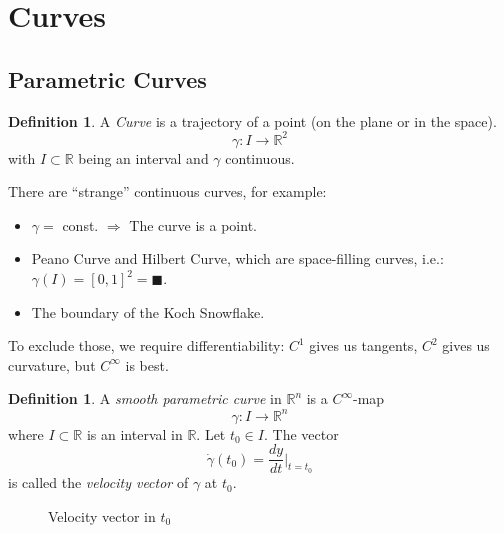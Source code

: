 \documentclass[a4paper,11pt,notitlepage,fullpage]{paper}
\theoremstyle{plain}
\theoremstyle{definition}
\newtheorem{defn}[thm]{Definition} %
\begin{document}
\section{Curves}

\subsection{Parametric Curves}

\begin{defn}
A \emph{Curve} is a trajectory of a point (on the plane or in the space).
\begin{equation*}
\gamma: I \to \mathbb R^2
\end{equation*}
with $I \subset \mathbb R$ being an interval and $\gamma$ continuous.
\end{defn}

There are ``strange'' continuous curves, for example:
\begin{itemize}
\item $\gamma = $ const. $\Rightarrow$ The curve is a point.

\item Peano Curve and Hilbert Curve, which are space-filling curves, i.e.: $\gamma(I) = [0,1]^2 = \blacksquare$.

\item The boundary of the Koch Snowflake.
\end{itemize}


To exclude those, we require differentiability: $C^1$ gives us tangents, $C^2$ gives us curvature, but $C^\infty$ is best.

\begin{defn}
A \emph{smooth parametric curve} in $\mathbb R^n$ is a $C^\infty$-map 
\begin{equation*}
\gamma: I \to \mathbb R^n
\end{equation*}
where $I \subset \mathbb R$ is an interval in $\mathbb R$. Let $t_0 \in I$. The vector 
\begin{equation*}
\dot\gamma(t_0) = \frac{dy}{dt}\Big|_{t = t_0}
\end{equation*}
is called the \emph{velocity vector} of $\gamma$ at $t_0$.
\end{defn}


\begin{figure}[H]
\centering
\def\svgwidth{0.3\textwidth}

\caption{Velocity vector in $t_0$}
\label{fig:velocity-vector}
\end{figure}
\end{document}
